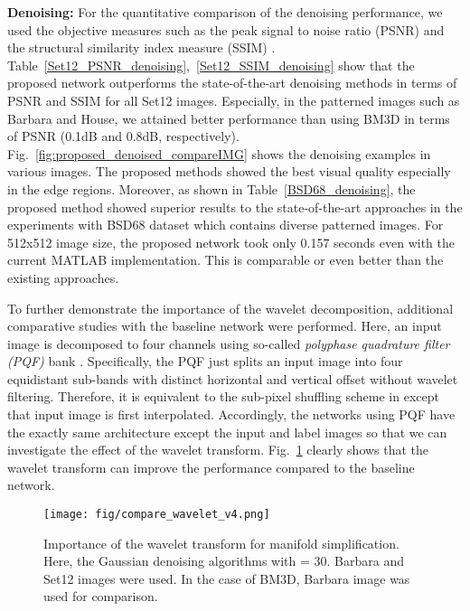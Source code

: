 \documentclass[10pt,twocolumn,letterpaper]{article}
\begin{document}
{\bf Denoising:}
For the quantitative comparison of the denoising performance, we used the objective measures such as the peak signal to noise ratio (PSNR) and the structural similarity index measure (SSIM) \cite{wang2004image}.
Table~\ref{Set12_PSNR_denoising},~\ref{Set12_SSIM_denoising} show that the proposed network outperforms the state-of-the-art denoising methods in terms of PSNR and SSIM for all Set12 images. Especially, in the patterned images such as Barbara and House, we attained better performance than using BM3D in terms of PSNR (0.1dB and 0.8dB, respectively).
Fig.~\ref{fig:proposed_denoised_compareIMG} shows the denoising examples in various images. The proposed methods showed the best visual quality especially in the edge regions.
Moreover, as shown in Table~\ref{BSD68_denoising}, the proposed method showed superior results to the state-of-the-art approaches in the experiments with BSD68 dataset
which contains diverse patterned images.
For 512x512 image size, the proposed network took only 0.157 seconds even with the current MATLAB implementation. This is comparable or even better than the existing approaches.

To further demonstrate the importance of the wavelet decomposition, additional comparative studies with the baseline network were performed. Here, an input image is decomposed to four channels using so-called {\em polyphase quadrature filter (PQF)} bank \cite{vetterli1995wavelets}.
Specifically, the PQF just splits an input image into four equidistant sub-bands with distinct horizontal and vertical offset without wavelet filtering. Therefore, it is equivalent to the sub-pixel shuffling scheme in \cite{shi2016real} except that 
input image is first interpolated.
Accordingly, the networks using PQF have the exactly same architecture except the input and label images so that we can investigate the effect of the wavelet transform.
Fig.~\ref{fig:comparison_of_waveletdecomposition} clearly shows that the wavelet transform can improve the performance compared to the baseline network.

\begin{figure}[!hbt]
\centerline{\texttt{[image: fig/compare\_wavelet\_v4.png]}}
\caption{Importance of the wavelet transform for manifold simplification. Here, the Gaussian denoising algorithms with  = 30. Barbara and Set12 images were used. In the case of BM3D, Barbara image was used for comparison.}
\label{fig:comparison_of_waveletdecomposition}
\end{figure}
\end{document}
